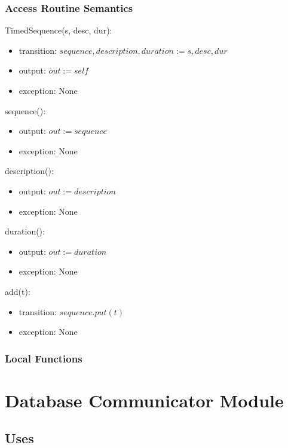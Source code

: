 \documentclass[12pt, titlepage]{article}
\begin{document}
\subsubsection{Access Routine Semantics}

TimedSequence(s, desc, dur):
\begin{itemize}
	\item transition: $sequence, description, duration := s, desc, dur$
	\item output: $out := self$
	\item exception: None
\end{itemize}

sequence():
\begin{itemize}
	\item output: $out := sequence$
	\item exception: None
\end{itemize}

description():
\begin{itemize}
	\item output: $out := description$
	\item exception: None
\end{itemize}

duration():
\begin{itemize}
	\item output: $out := duration$
	\item exception: None
\end{itemize}

add(t):
\begin{itemize}
	\item transition: $sequence.put(t)$
	\item exception: None
\end{itemize}

\subsubsection{Local Functions}

\newpage

\section{Database Communicator Module}

\subsection{Uses}
\end{document}

